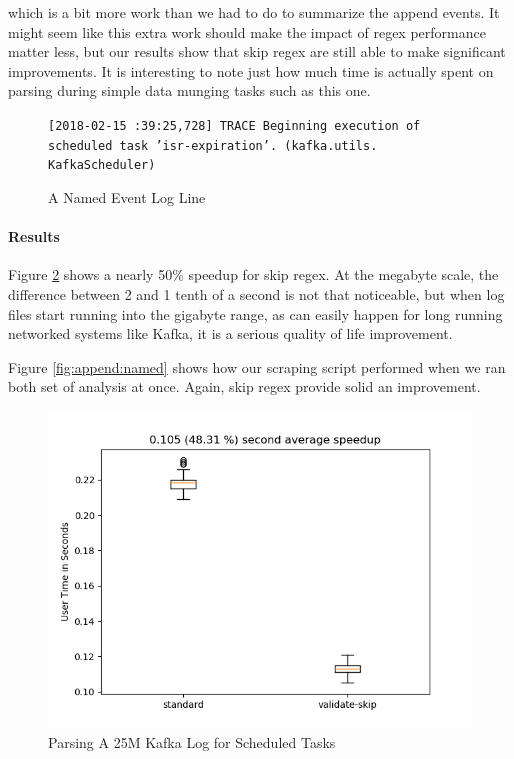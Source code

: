 \noindent
which is a bit more work than we had to do to summarize the append
events. It might seem like this extra work should make the impact
of regex performance matter less, but our results show that
skip regex are still able to make significant improvements.
It is interesting to note just how much time is actually spent
on parsing during simple data munging tasks such as this one.

\begin{figure}
\caption{A Named Event Log Line}
\label{fig:namedevent}

\texttt{[2018-02-15 :39:25,728] \allowbreak TRACE \allowbreak
Beginning execution \allowbreak of scheduled \allowbreak
task 'isr-expiration'\allowbreak . \allowbreak(kafka.utils.\allowbreak
KafkaScheduler)
}
\end{figure}


\paragraph{Results}

Figure \ref{fig:named} shows a nearly 50\% speedup for skip regex.
At the megabyte scale, the difference between 2 and 1 tenth of
a second is not that noticeable, but when log files start running
into the gigabyte range, as can easily happen for long running
networked systems like Kafka, it is a serious quality of life
improvement.

Figure \ref{fig:append:named} shows how our scraping script
performed when we ran both set of analysis at once. Again,
skip regex provide solid an improvement.

\begin{figure}
\caption{Parsing A 25M Kafka Log for Scheduled Tasks}
\label{fig:named}

\includegraphics{resources/named.png}
\end{figure}

